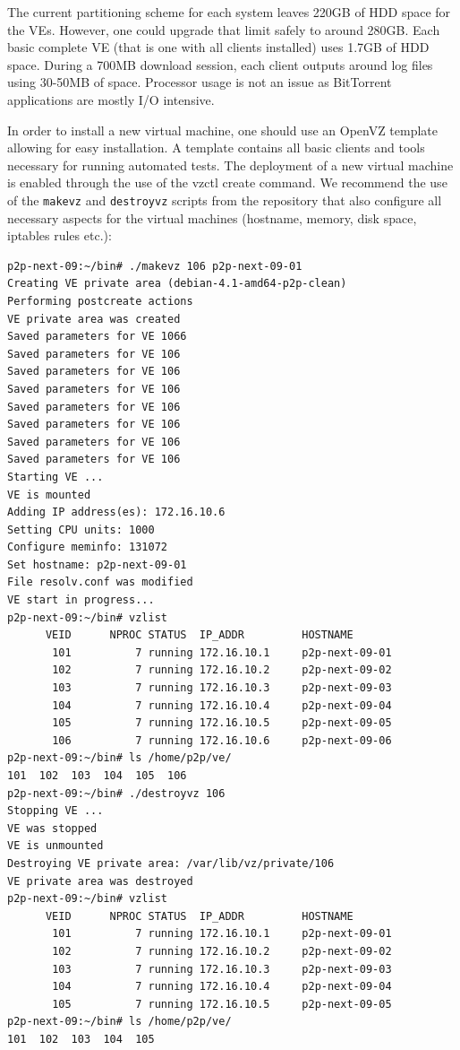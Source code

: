 The current partitioning scheme for each system leaves 220GB of HDD space for
the VEs. However, one could upgrade that limit safely to around 280GB. Each
basic complete VE (that is one with all clients installed) uses 1.7GB of HDD
space. During a 700MB download session, each client outputs around log files
using 30-50MB of space. Processor usage is not an issue as BitTorrent
applications are mostly I/O intensive.

In order to install a new virtual machine, one should use an OpenVZ template
allowing for easy installation. A template contains all basic clients and
tools necessary for running automated tests. The deployment of a new virtual
machine is enabled through the use of the vzctl create command. We recommend
the use of the \texttt{makevz} and \texttt{destroyvz} scripts from the repository that also
configure all necessary aspects for the virtual machines (hostname, memory,
disk space, iptables rules etc.):

\footnotesize
\begin{verbatim}
p2p-next-09:~/bin# ./makevz 106 p2p-next-09-01
Creating VE private area (debian-4.1-amd64-p2p-clean)
Performing postcreate actions
VE private area was created
Saved parameters for VE 1066
Saved parameters for VE 106
Saved parameters for VE 106
Saved parameters for VE 106
Saved parameters for VE 106
Saved parameters for VE 106
Saved parameters for VE 106
Saved parameters for VE 106
Starting VE ...
VE is mounted
Adding IP address(es): 172.16.10.6
Setting CPU units: 1000
Configure meminfo: 131072
Set hostname: p2p-next-09-01
File resolv.conf was modified
VE start in progress...
p2p-next-09:~/bin# vzlist
      VEID      NPROC STATUS  IP_ADDR         HOSTNAME
       101          7 running 172.16.10.1     p2p-next-09-01
       102          7 running 172.16.10.2     p2p-next-09-02
       103          7 running 172.16.10.3     p2p-next-09-03
       104          7 running 172.16.10.4     p2p-next-09-04
       105          7 running 172.16.10.5     p2p-next-09-05
       106          7 running 172.16.10.6     p2p-next-09-06
p2p-next-09:~/bin# ls /home/p2p/ve/
101  102  103  104  105  106
p2p-next-09:~/bin# ./destroyvz 106
Stopping VE ...
VE was stopped
VE is unmounted
Destroying VE private area: /var/lib/vz/private/106
VE private area was destroyed
p2p-next-09:~/bin# vzlist
      VEID      NPROC STATUS  IP_ADDR         HOSTNAME
       101          7 running 172.16.10.1     p2p-next-09-01
       102          7 running 172.16.10.2     p2p-next-09-02
       103          7 running 172.16.10.3     p2p-next-09-03
       104          7 running 172.16.10.4     p2p-next-09-04
       105          7 running 172.16.10.5     p2p-next-09-05
p2p-next-09:~/bin# ls /home/p2p/ve/
101  102  103  104  105
\end{verbatim}
\normalsize

